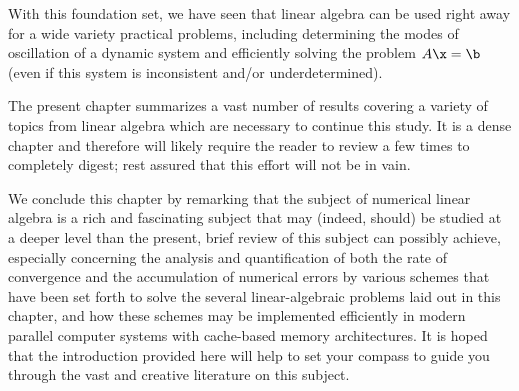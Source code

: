 With this foundation set, we have seen that linear algebra can be used right away for a wide variety practical
problems, including determining the modes of oscillation of a dynamic system and
efficiently solving the problem $A\x=\b$ (even if this system is inconsistent and/or underdetermined).

The present chapter summarizes a vast number of results covering a variety of topics from linear algebra which
are necessary to continue this study.  It is a dense chapter and therefore will likely require the reader to review
a few times to completely digest; rest assured that this effort will not be in vain.

We conclude this chapter by remarking that the subject of numerical linear algebra is a rich
and fascinating subject that may (indeed, should) be studied at a deeper level
than the present, brief review of this subject can possibly achieve,
especially concerning the analysis and quantification of both the rate of convergence and the accumulation
of numerical errors by various schemes that have been set forth to solve the several linear-algebraic problems laid out
in this chapter, and how these schemes may be implemented efficiently in modern parallel computer systems with
cache-based memory architectures.  It is hoped that the introduction provided here will
help to set your compass to guide you through the vast and creative literature on this subject.

%



